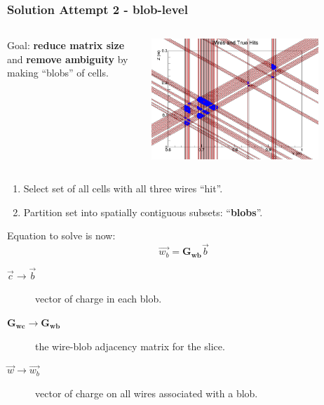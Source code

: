\documentclass[xcolor=dvipsnames]{beamer}
\begin{document}
\begin{frame}
  \frametitle{Solution Attempt 2 - blob-level}
  \vspace{-10mm}
  \begin{columns}
    \begin{column}{0.6\textwidth}
      Goal: \textbf{reduce matrix size} and \textbf{remove ambiguity} by making ``blobs'' of cells.
    \end{column}
    \begin{column}{0.4\textwidth}
      \includegraphics[width=0.8\textwidth]{wires-and-true-hits.png}          
    \end{column}
  \end{columns}
      
  \begin{enumerate}
  \item Select set of all cells with all three wires ``hit''.
  \item Partition set into spatially contiguous subsets: ``\textbf{blobs}''.
  \end{enumerate}
  Equation to solve is now:
  \[\vec{w_b} = \mathbf{G_{wb}} \vec{b}\]

  \begin{description}
  \item[$\vec{c} \to \vec{b}$] vector of charge in each blob.
  \item[$\mathbf{G_{wc}} \to \mathbf{G_{wb}}$] the wire-blob adjacency matrix for the slice.
  \item[$\vec{w} \to \vec{w_b}$] vector of charge on all wires associated with a blob.
  \end{description}

\end{frame}
\end{document}
